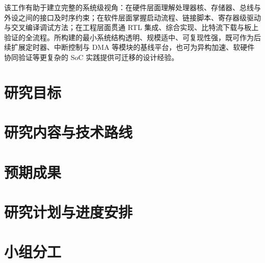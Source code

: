\documentclass[12pt,a4paper]{ctexart}
\begin{document}
该工作有助于建立完整的系统级视角：在硬件层面理解处理器核、存储器、总线与外设之间的接口及时序约束；在软件层面掌握启动流程、链接脚本、寄存器级驱动与交叉编译调试方法；在工程层面贯通 RTL 集成、综合实现、比特流下载与板上验证的全流程。所构建的最小系统结构透明、规模适中、可复现性强，既可作为后续扩展定时器、中断控制与 DMA 等模块的基线平台，也可为异构加速、软硬件协同验证等更复杂的 SoC 实践提供可迁移的设计经验。

\section{研究目标}


\section{研究内容与技术路线}


\section{预期成果}

\section{研究计划与进度安排}


\section{小组分工}
\end{document}
